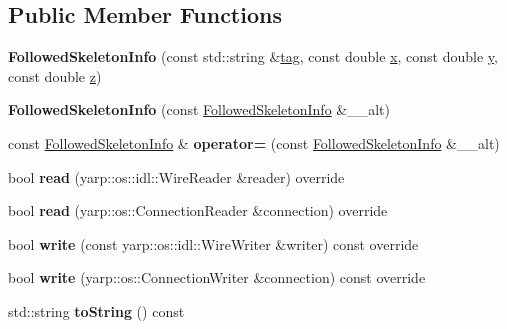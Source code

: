 \subsection*{Public Member Functions}
\begin{DoxyCompactItemize}
\item 
\mbox{\label{classFollowedSkeletonInfo_a79eb3c479a16d42cc86911ce4bd58a0e}} 
{\bfseries Followed\+Skeleton\+Info} (const std\+::string \&\mbox{\hyperlink{classFollowedSkeletonInfo_a6e749fa0208ef825c6b40ad6bbf825d4}{tag}}, const double \mbox{\hyperlink{classFollowedSkeletonInfo_aa73a5373607a251d22f2fdb6078ee365}{x}}, const double \mbox{\hyperlink{classFollowedSkeletonInfo_af988aa2cef6f97786677c2fe402def20}{y}}, const double \mbox{\hyperlink{classFollowedSkeletonInfo_a83222015ccfa4b8865f935d6ef777717}{z}})
\item 
\mbox{\label{classFollowedSkeletonInfo_a9e0fc586a8aa4607551f22b918d9f56f}} 
{\bfseries Followed\+Skeleton\+Info} (const \mbox{\hyperlink{classFollowedSkeletonInfo}{Followed\+Skeleton\+Info}} \&\+\_\+\+\_\+alt)
\item 
\mbox{\label{classFollowedSkeletonInfo_ae4ed17f11804075cdf10df0f4b205e6d}} 
const \mbox{\hyperlink{classFollowedSkeletonInfo}{Followed\+Skeleton\+Info}} \& {\bfseries operator=} (const \mbox{\hyperlink{classFollowedSkeletonInfo}{Followed\+Skeleton\+Info}} \&\+\_\+\+\_\+alt)
\item 
\mbox{\label{classFollowedSkeletonInfo_abdc9af01979e3fc0839e6f5851199688}} 
bool {\bfseries read} (yarp\+::os\+::idl\+::\+Wire\+Reader \&reader) override
\item 
\mbox{\label{classFollowedSkeletonInfo_ae2aeb71e337ee649b92ee357a892aaa6}} 
bool {\bfseries read} (yarp\+::os\+::\+Connection\+Reader \&connection) override
\item 
\mbox{\label{classFollowedSkeletonInfo_aff7da0b79de4f402d97837d7d2eea185}} 
bool {\bfseries write} (const yarp\+::os\+::idl\+::\+Wire\+Writer \&writer) const override
\item 
\mbox{\label{classFollowedSkeletonInfo_aa6ee9d16640f735a4ac69b6b530a9e95}} 
bool {\bfseries write} (yarp\+::os\+::\+Connection\+Writer \&connection) const override
\item 
\mbox{\label{classFollowedSkeletonInfo_ae3639d9c3d8254557c7dd7409f471933}} 
std\+::string {\bfseries to\+String} () const
\end{DoxyCompactItemize}
